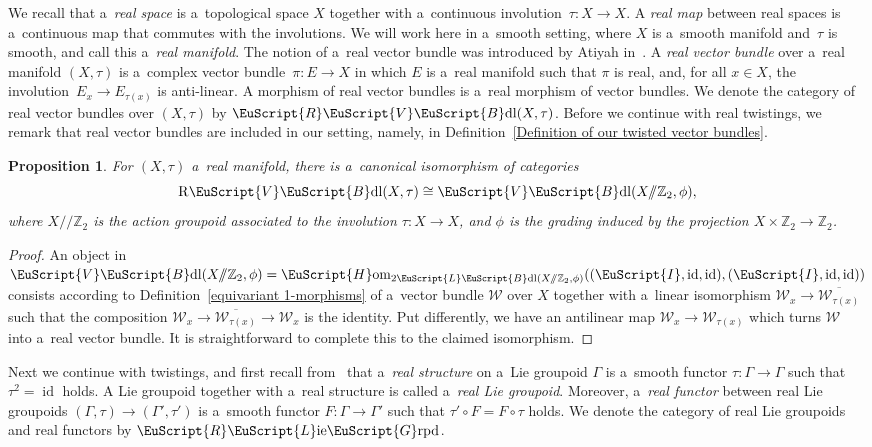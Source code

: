 \documentclass[pdftex]{sigma}
\numberwithin{equation}{section}
\newtheorem{Proposition}[Theorem]{Proposition}
 { \theoremstyle{definition}
\newtheorem{Definition}[Theorem]{Definition}
\newtheorem{Example}[Theorem]{Example}
\newtheorem{Remark}[Theorem]{Remark} }
\def\mathscr#1{\EuScript{#1}}
\def\Z {\mathbb{Z}}
\def\liegrpd{\mathscr{L}\text{ie}\mathscr{G}\text{rpd}}
\def\act#1#2{#1/\!\!/#2}
\newcommand{\id}{\operatorname{id}}
\newcommand{\Hom}{\mathscr{H}\mathrm{om}}
\newcommand{\VectBdl}{\mathscr{V}\mathscr{B}\mathrm{dl}}
\newcommand{\LineBdl}{\mathscr{L}\mathscr{B}\mathrm{dl}}
\newcommand{\twoLineBdl}{2\LineBdl}
\def\Rliegrpd{\normalfont\mathscr{R}\liegrpd}
\def\RVectBdl{\mathscr{R}\VectBdl}
\begin{document}
We recall that a~\emph{real space} is a~topological space $X$ together with a~continuous involution~${\tau \colon X \to X}$. A \emph{real map} between real spaces is a~continuous map that commutes with the involutions.
We will work here in a~smooth setting, where $X$ is a~smooth manifold and~$\tau$ is smooth, and call this a~\emph{real manifold}.
The notion of a~real vector bundle was introduced by Atiyah in~\cite{Atiyah1966Reality}. A \emph{real vector bundle} over a~real manifold $(X,\tau)$ is a~complex vector bundle~${\pi \colon E \to X}$ in which $E$ is a~real manifold such that $\pi$ is real, and, for all $x \in X$, the involution~${E_x \to E_{\tau(x)}}$ is anti-linear.
A morphism of real vector bundles is a~real morphism of vector bundles.
We denote the category of real vector bundles over $(X,\tau)$ by $\RVectBdl(X,\tau)$. Before we continue with real twistings, we remark that real vector bundles are included in our setting, namely, in Definition~\ref{Definition of our twisted vector bundles}.
\begin{Proposition}
For $(X,\tau)$ a~real manifold, there is a~canonical isomorphism of categories
\begin{equation*}
\mathrm{R}\VectBdl(X,\tau) \cong \VectBdl(\act X\Z_2,\phi),
\end{equation*}
where $\act X\Z_2$ is the action groupoid
associated to the involution $\tau \colon X \to X$, and $\phi$ is the grading induced by the projection $X \times \Z_2 \to \Z_2$.
\end{Proposition}
\begin{proof}
 An object in $\VectBdl(\act X\Z_2,\phi)=\Hom_{\twoLineBdl(\act X\Z_2,\phi)}((\mathscr{I},\id,\id), (\mathscr{I},\id,\id))$ consists according to Definition~\ref{equivariant 1-morphisms} of a~vector bundle $\mathcal{W}$ over $X$ together with a~linear isomorphism
 $\mathcal{W}_x \to \overline{\mathcal{W}_{\tau(x)}}$ such that the composition $\mathcal{W}_x \to \overline{\mathcal{W}_{\tau(x)}} \to \mathcal{W}_x$ is the identity. Put differently, we have an antilinear
 map $\mathcal{W}_x \to \mathcal{W}_{\tau(x)}$ which turns $\mathcal{W}$ into a~real vector bundle. It is straightforward to complete this to the claimed isomorphism.
\end{proof}

Next we continue with twistings, and first recall from~\cite{mohamedmoutuou2012} that a~\emph{real structure} on a~Lie groupoid $\Gamma$ is a~smooth functor $\tau \colon \Gamma \to \Gamma$ such that
$\tau^2 = \id$ holds. A Lie groupoid together with a~real structure is called a~\emph{real Lie groupoid}.
Moreover, a~\emph{real functor} between real Lie groupoids $(\Gamma,\tau) \to (\Gamma',\tau')$ is a~smooth functor $F \colon \Gamma \to \Gamma'$ such that
$\tau' \circ F = F \circ \tau$ holds. We denote the category of real Lie groupoids and real functors by $\Rliegrpd$.
\end{document}
